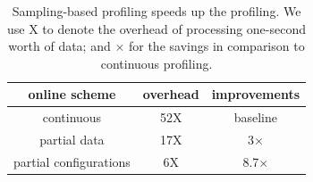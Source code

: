 
\begin{table}[t]
  \centering
  \begin{tabular}{c c c}
    \toprule
    online scheme & overhead & improvements \\
    \midrule
    continuous & 52X & baseline \\
    partial data & 17X & 3$\times$\\
    partial configurations & 6X & 8.7$\times$ \\
    \bottomrule
  \end{tabular}
  \caption{Sampling-based profiling speeds up the profiling. We use X to denote the overhead of processing one-second worth of data; and $\times$ for the savings in comparison to continuous profiling.}
  \label{tab:online}
\end{table}


